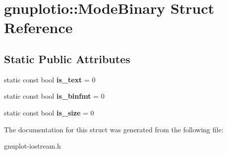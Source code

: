 \hypertarget{structgnuplotio_1_1ModeBinary}{}\section{gnuplotio\+:\+:Mode\+Binary Struct Reference}
\label{structgnuplotio_1_1ModeBinary}
\subsection*{Static Public Attributes}
\begin{DoxyCompactItemize}
\item 
\mbox{\label{structgnuplotio_1_1ModeBinary_ac89064b5df24f7ef4d765fdfde4fd1b6}} 
static const bool {\bfseries is\+\_\+text} = 0
\item 
\mbox{\label{structgnuplotio_1_1ModeBinary_aee724034dc3372b8e12b1187507bf136}} 
static const bool {\bfseries is\+\_\+binfmt} = 0
\item 
\mbox{\label{structgnuplotio_1_1ModeBinary_a6eae25ea662362bbb88bc987d6025290}} 
static const bool {\bfseries is\+\_\+size} = 0
\end{DoxyCompactItemize}


The documentation for this struct was generated from the following file\+:\begin{DoxyCompactItemize}
\item 
gnuplot-\/iostream.\+h\end{DoxyCompactItemize}
